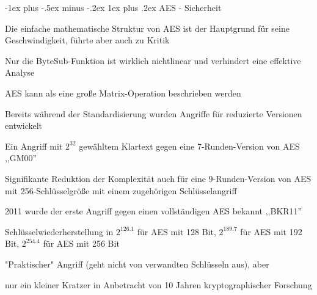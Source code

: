 \documentclass[a4paper]{article}
\makeatletter
\renewcommand{\subsubsection}{\@startsection{subsubsection}{3}{0mm}%
 {-1ex plus -.5ex minus -.2ex}%
 {1ex plus .2ex}%
 {\normalfont\small\bfseries}}
\makeatother
\begin{document}
\begin{multicols}{3}
      \subsubsection{AES - Sicherheit}
      \begin{itemize*}
            \item Die einfache mathematische Struktur von AES ist der Hauptgrund für seine Geschwindigkeit, führte aber auch zu Kritik
            \item Nur die ByteSub-Funktion ist wirklich nichtlinear und verhindert eine effektive Analyse
            \item AES kann als eine große Matrix-Operation beschrieben werden
            \item Bereits während der Standardisierung wurden Angriffe für reduzierte Versionen entwickelt
            \begin{itemize*}
                  \item Ein Angriff mit $2^{32}$ gewähltem Klartext gegen eine 7-Runden-Version von AES ,,GM00''
                  \item Signifikante Reduktion der Komplexität auch für eine 9-Runden-Version von AES mit 256-Schlüsselgröße mit einem zugehörigen Schlüsselangriff
            \end{itemize*}
            \item 2011 wurde der erste Angriff gegen einen vollständigen AES bekannt ,,BKR11''
            \begin{itemize*}
                  \item Schlüsselwiederherstellung in $2^{126.1}$ für AES mit 128 Bit, $2^{189.7}$ für AES mit 192 Bit, $2^{254.4}$ für AES mit 256 Bit
                  \item "Praktischer" Angriff (geht nicht von verwandten Schlüsseln aus), aber
                  \item nur ein kleiner Kratzer in Anbetracht von 10 Jahren kryptographischer Forschung
            \end{itemize*}
      \end{itemize*}



\end{multicols}
\end{document}
